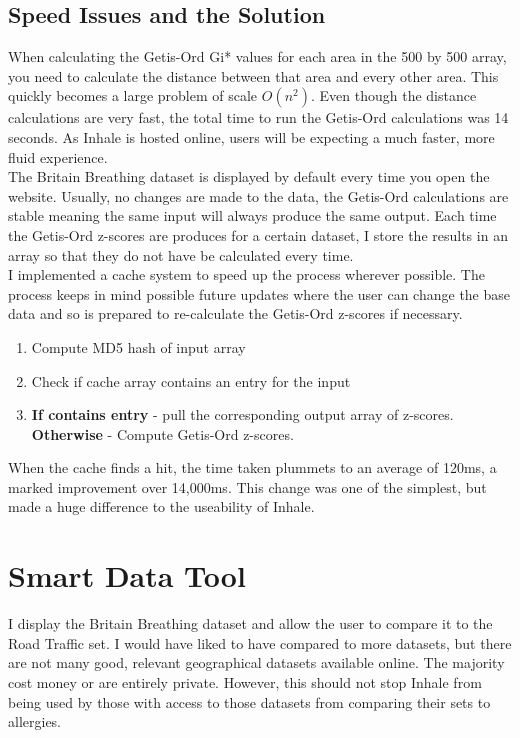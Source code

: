 \subsection{Speed Issues and the Solution}

When calculating the Getis-Ord Gi* values for each area in the 500 by 500 array, you need to calculate the distance between that area and every other area. This quickly becomes a large problem of scale $O(n^2)$. Even though the distance calculations are very fast, the total time to run the Getis-Ord calculations was 14 seconds. As Inhale is hosted online, users will be expecting a much faster, more fluid experience.\\

The Britain Breathing dataset is displayed by default every time you open the website. Usually, no changes are made to the data, the Getis-Ord calculations are stable meaning the same input will always produce the same output. Each time the Getis-Ord z-scores are produces for a certain dataset, I store the results in an array so that they do not have be calculated every time.\\

I implemented a cache system to speed up the process wherever possible. The process keeps in mind possible future updates where the user can change the base data and so is prepared to re-calculate the Getis-Ord z-scores if necessary.\\

\begin{enumerate}
    \item Compute MD5 hash of input array
    \item Check if cache array contains an entry for the input
    \item \textbf{If contains entry} - pull the corresponding output array of z-scores. \textbf{Otherwise} - Compute Getis-Ord z-scores.
\end{enumerate}

When the cache finds a hit, the time taken plummets to an average of 120ms, a marked improvement over 14,000ms. This change was one of the simplest, but made a huge difference to the useability of Inhale.

\section{Smart Data Tool}

I display the Britain Breathing dataset and allow the user to compare it to the Road Traffic set. I would have liked to have compared to more datasets, but there are not many good, relevant geographical datasets available online. The majority cost money or are entirely private. However, this should not stop Inhale from being used by those with access to those datasets from comparing their sets to allergies.\\

